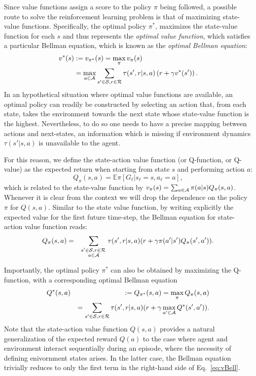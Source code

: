 Since value functions assign a score to the policy $\pi$ being followed, a possible route to solve the reinforcement learning problem is that of maximizing state-value functions. Specifically, the optimal policy $\pi^{*}$, maximizes the state-value function for each $s$ and thus represents the \textit{optimal value function}, which satisfies a particular Bellman equation, which is known as the \textit{optimal Bellman equation}:
\begin{align}\label{eq:vBellOp}
v^{*}(s)&:=v_{\pi^*}(s)=\max_\pi v_\pi(s)\\
&=\max_{a\in\mathcal{A}}\sum_{s'\in\mathcal{S},r\in\mathcal{R}}\tau(s',r|s,a)\left(r+\gamma v^{*}(s')\right).
\end{align}
In an hypothetical situation where optimal value functions are available, an optimal policy can readily be constructed by selecting an action that, from each state, takes the environment towards the next state whose state-value function is the highest. Nevertheless, to do so one needs to have a precise mapping between actions and next-states, an information which is missing if environment dynamics $\tau(s'|s,a)$ is unavailable to the agent.

For this reason, we define the state-action value function (or Q-function, or Q-value) as the expected return when starting from state $s$ and performing action $a$:
\begin{equation}
Q_\pi(s,a) = \mathbb{E}{\pi}\left[G_\ell | s_\ell=s, a_\ell=a\right],
\end{equation}
which is related to the state-value function by $v_\pi(s)=\sum_{a\in\mathcal{A}} \pi(a|s) Q_\pi(s,a)$. Whenever it is clear from the context we will drop the dependence on the policy $\pi$ for $Q(s,a)$.
Similar to the state value function, by writing explicitly the expected value for the first future time-step, the Bellman equation for state-action value function reads:
\begin{eqnarray}\label{eq:bellqas}
Q_{\pi}(s,a)&=& \sum_{\substack{ s'\in\mathcal{S}, r\in\mathcal{R}\,\\ a\in\mathcal{A}} } \tau(s',r|s,a)(r+\gamma \pi(a'|s')Q_{\pi}(s',a')).\nonumber
\end{eqnarray}

Importantly, the optimal policy $\pi^*$ can also be obtained by maximizing the Q-function, with a corresponding optimal Bellman equation
\begin{eqnarray}\label{eq:qBellOp}
Q^{*}(s,a)&&:=Q_{\pi^*}(s,a)=\max_\pi Q_\pi(s,a)\\
&&=\sum_{s'\in\mathcal{S},r\in\mathcal{R}}\tau(s',r|s,a)(r+\gamma \max_{a'\in\mathcal{A}}Q^{*}(s',a')).\nonumber
\end{eqnarray}
Note that the state-action value function $Q(s,a)$ provides a natural generalization of the expected reward $Q(a)$ to the case where agent and environment interact sequentially during an episode, where the necessity of defining enivornment states arises. In the latter case, the Bellman equation trivially reduces to only the first term in the right-hand side of Eq.~\ref{eq:vBell}.

